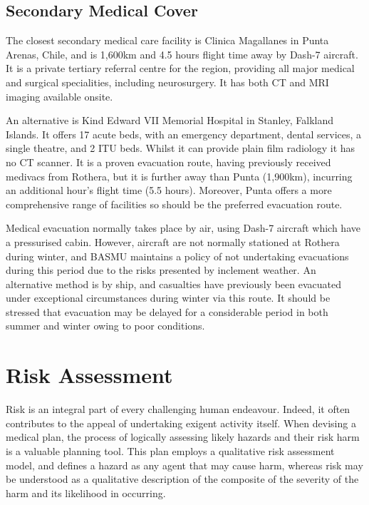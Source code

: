 \documentclass[12pt,a4paper]{article}
\begin{document}
\subsection{Secondary Medical Cover}

The closest secondary medical care facility is Clinica Magallanes\cite{Anonymous:TgM8hVWD} in Punta Arenas, Chile, and is 1,600km and 4.5 hours flight time away by Dash-7 aircraft. It is a private tertiary referral centre for the region, providing all major medical and surgical specialities, including neurosurgery. It has both CT and MRI imaging available onsite.

An alternative is Kind Edward VII Memorial Hospital in Stanley, Falkland Islands. It offers 17 acute beds, with an emergency department, dental services, a single theatre, and 2 ITU beds.\cite{Anonymous:qFBtPcmx} Whilst it can provide plain film radiology it has no CT scanner. It is a proven evacuation route, having previously received medivacs from Rothera, but it is further away than Punta (1,900km), incurring an additional hour's flight time (5.5 hours). Moreover, Punta offers a more comprehensive range of facilities so should be the preferred evacuation route.

Medical evacuation normally takes place by air, using Dash-7 aircraft which have a pressurised cabin. However, aircraft are not normally stationed at Rothera during winter, and BASMU maintains a policy of not undertaking evacuations during this period due to the risks presented by inclement weather. An alternative method is by ship, and casualties have previously been evacuated under exceptional circumstances during winter via this route. It should be stressed that evacuation may be delayed for a considerable period in both summer and winter owing to poor conditions.

\section{Risk Assessment}

Risk is an integral part of every challenging human endeavour. Indeed, it often contributes to the appeal of undertaking exigent activity itself. When devising a medical plan, the process of logically assessing likely hazards and their risk harm is a valuable planning tool. This plan employs a qualitative risk assessment model, and defines a hazard as any agent that may cause harm, whereas risk may be understood as a qualitative description of the composite of the severity of the harm and its likelihood in occurring.\cite{TheNationalPatientSafetyAgency:2007ud}
\end{document}
